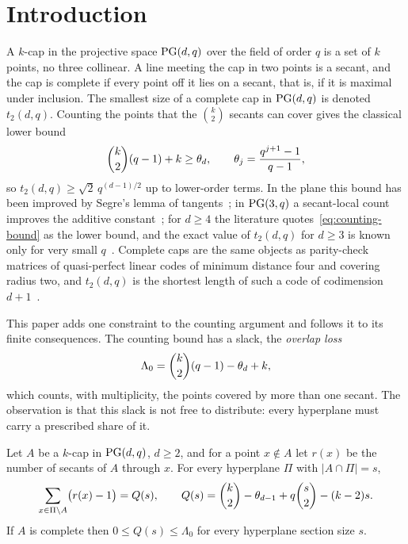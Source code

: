 \section{Introduction}
\label{sec:introduction}

A \(k\)-cap in the projective space \(\mathrm{PG}(d,q)\) over the field of order
\(q\) is a set of \(k\) points, no three collinear.  A line meeting the cap
in two points is a secant, and the cap is complete if every point off it
lies on a secant, that is, if it is maximal under inclusion.  The smallest
size of a complete cap in \(\mathrm{PG}(d,q)\) is denoted \(t_2(d,q)\).  Counting
the points that the \(\binom{k}{2}\) secants can cover gives the classical
lower bound
\begin{equation}
 \binom{k}{2}(q-1)+k\ge\theta_d,
 \qquad
 \theta_j=\frac{q^{j+1}-1}{q-1},
\label{eq:counting-bound}
\end{equation}
so \(t_2(d,q)\ge\sqrt2\,q^{(d-1)/2}\) up to lower-order terms.  In the
plane this bound has been improved by Segre's lemma of
tangents~\cite{Segre1959,Polverino1999}; in \(\mathrm{PG}(3,q)\) a secant-local
count improves the additive constant~\cite{RuddSecantDefects}; for
\(d\ge4\) the literature quotes~\eqref{eq:counting-bound} as the lower
bound, and the exact value of \(t_2(d,q)\) for \(d\ge3\) is known only for
very small \(q\)~\cite{DavydovFainaMarcuginiPambianco2017,
BartoliDavydovKreshchukMarcuginiPambianco2016,BartoliFainaMarcuginiPambianco2017}.
Complete caps are the same objects as parity-check matrices of
quasi-perfect linear codes of minimum distance four and covering radius
two, and \(t_2(d,q)\) is the shortest length of such a code of
codimension \(d+1\)~\cite{DavydovFainaMarcuginiPambianco2017}.

This paper adds one constraint to the counting argument and follows it to
its finite consequences.  The counting bound has a slack, the
\emph{overlap loss}
\begin{equation}
 \Lambda_0=\binom{k}{2}(q-1)-\theta_d+k,
\label{eq:loss}
\end{equation}
which counts, with multiplicity, the points covered by more than one
secant.  The observation is that this slack is not free to distribute:
every hyperplane must carry a prescribed share of it.

\begin{theorem}
\label{thm:hyperplane-loss}
Let \(A\) be a \(k\)-cap in \(\mathrm{PG}(d,q)\), \(d\ge2\), and for a point
\(x\notin A\) let \(r(x)\) be the number of secants of \(A\) through
\(x\).  For every hyperplane \(\Pi\) with \(|A\cap\Pi|=s\),
\begin{equation}
 \sum_{x\in\Pi\setminus A}\bigl(r(x)-1\bigr)=Q(s),
 \qquad
 Q(s)=\binom{k}{2}-\theta_{d-1}+q\binom{s}{2}-(k-2)s.
\label{eq:hyperplane-loss}
\end{equation}
If \(A\) is complete then \(0\le Q(s)\le\Lambda_0\) for every hyperplane
section size \(s\).
\end{theorem}

